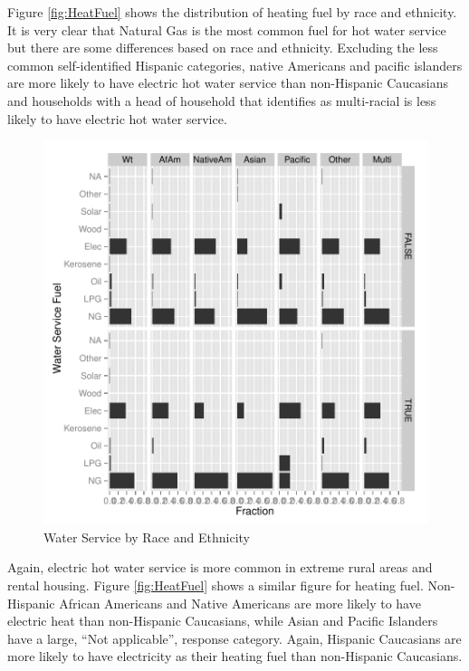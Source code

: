 \documentclass{article}
\begin{document}
Figure \ref{fig:HeatFuel} shows the distribution of heating fuel by race and ethnicity.  It is very clear that Natural Gas is the most common fuel for hot water service but there are some differences based on race and ethnicity.  Excluding the less common self-identified Hispanic categories, native Americans and pacific islanders are more likely to have electric hot water service than non-Hispanic Caucasians and households with a head of household that identifies as multi-racial is less likely to have electric hot water service.  

\begin{figure}[htbp]
\begin{center}
\caption{Water Service by Race and Ethnicity}
\label{fig:WaterService}
\includegraphics{DraftEdwardsWoods-007}
\end{center}
\end{figure}

Again, electric hot water service is more common in extreme rural areas and rental housing.  Figure \ref{fig:HeatFuel} shows a similar figure for heating fuel.  Non-Hispanic African Americans and Native Americans are more likely to have electric heat than non-Hispanic Caucasians, while Asian and Pacific Islanders have a large, ``Not applicable'', response category.   Again, Hispanic Caucasians are more likely to have electricity as their heating fuel than non-Hispanic Caucasians.
\end{document}
